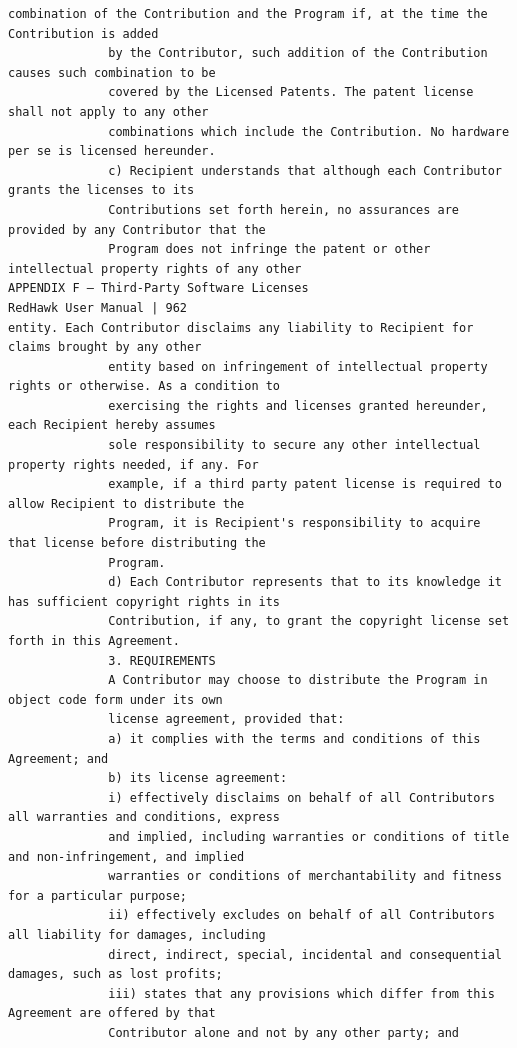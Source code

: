 \begin{lstlisting}[basicstyle=\ttfamily\scriptsize,breaklines=true]
              combination of the Contribution and the Program if, at the time the Contribution is added
              by the Contributor, such addition of the Contribution causes such combination to be
              covered by the Licensed Patents. The patent license shall not apply to any other
              combinations which include the Contribution. No hardware per se is licensed hereunder.
              c) Recipient understands that although each Contributor grants the licenses to its
              Contributions set forth herein, no assurances are provided by any Contributor that the
              Program does not infringe the patent or other intellectual property rights of any other
APPENDIX F — Third-Party Software Licenses                                      RedHawk User Manual | 962
entity. Each Contributor disclaims any liability to Recipient for claims brought by any other
              entity based on infringement of intellectual property rights or otherwise. As a condition to
              exercising the rights and licenses granted hereunder, each Recipient hereby assumes
              sole responsibility to secure any other intellectual property rights needed, if any. For
              example, if a third party patent license is required to allow Recipient to distribute the
              Program, it is Recipient's responsibility to acquire that license before distributing the
              Program.
              d) Each Contributor represents that to its knowledge it has sufficient copyright rights in its
              Contribution, if any, to grant the copyright license set forth in this Agreement.
              3. REQUIREMENTS
              A Contributor may choose to distribute the Program in object code form under its own
              license agreement, provided that:
              a) it complies with the terms and conditions of this Agreement; and
              b) its license agreement:
              i) effectively disclaims on behalf of all Contributors all warranties and conditions, express
              and implied, including warranties or conditions of title and non-infringement, and implied
              warranties or conditions of merchantability and fitness for a particular purpose;
              ii) effectively excludes on behalf of all Contributors all liability for damages, including
              direct, indirect, special, incidental and consequential damages, such as lost profits;
              iii) states that any provisions which differ from this Agreement are offered by that
              Contributor alone and not by any other party; and

\end{lstlisting}
